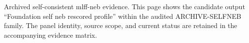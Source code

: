 Archived self-consistent mlff-neb evidence. This page shows the candidate output ``Foundation self neb rescored profile'' within the audited ARCHIVE-SELFNEB family. The panel identity, source scope, and current status are retained in the accompanying evidence matrix.

